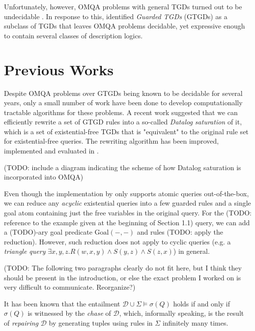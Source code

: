 \documentclass[12pt]{report}
\theoremstyle{plain}
\theoremstyle{definition}
\begin{document}
Unfortunately, however, OMQA problems with general TGDs turned out to be undecidable \cite{beeri_vardi_1981}. In response to this, \cite{cali_gottlob_kifer_2013} identified \emph{Guarded TGDs} (GTGDs) as a subclass of TGDs that leaves OMQA problems decidable, yet expressive enough to contain several classes of description logics.

\section{Previous Works}

Despite OMQA problems over GTGDs being known to be decidable for several years, only a small number of work have been done to develop computationally tractable algorithms for these problems. A recent work \cite{kappelmann_2019} suggested that we can efficiently rewrite a set of GTGD rules into a so-called \emph{Datalog saturation} of it, which is a set of existential-free TGDs that is "equivalent" to the original rule set for existential-free queries. The rewriting algorithm has been improved, implemented and evaluated in \cite{benedikt_buron_germano_kappelmann_motik_2022}. 

(TODO: include a diagram indicating the scheme of how Datalog saturation is incorporated into OMQA)

Even though the implementation by \cite{benedikt_buron_germano_kappelmann_motik_2022} only supports atomic queries out-of-the-box, we can reduce any \emph{acyclic} existential queries into a few guarded rules and a single goal atom containing just the free variables in the original query. For the (TODO: reference to the example given at the beginning of Section 1.1) query, we can add a (TODO)-ary goal predicate $\mathrm{Goal}(-, -)$ and rules (TODO: apply the reduction). However, such reduction does not apply to cyclic queries (e.g. a \emph{triangle query} $\exists x,y,z. R(w, x, y) \land S(y, z) \land S(z, x)$) in general.

(TODO: The following two paragraphs clearly do not fit here, but I think they should be present in the introduction, or else the exact problem I worked on is very difficult to communicate. Reorganize?)

It has been known that the entailment $\mathcal{D} \cup \Sigma \models \sigma(Q)$ holds if and only if $\sigma(Q)$ is witnessed by the \emph{chase} of $\mathcal{D}$, which, informally speaking, is the result of \emph{repairing} $\mathcal{D}$ by generating tuples using rules in $\Sigma$ infinitely many times. %
\end{document}
